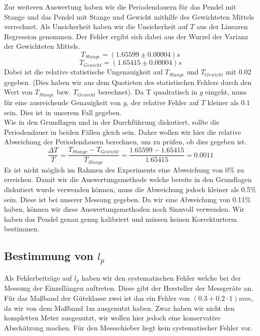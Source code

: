 \documentclass[twoside]{protokoll}
\begin{document}
Zur weiteren Auswertung haben wir die Periodendauern für das Pendel mit Stange und das Pendel mit Stange und Gewicht mithilfe des Gewichteten Mittels verrechnet.
Als Unsicherheit haben wir die Unsicherheit auf $T$ aus der Linearen Regression genommen.
Der Fehler ergibt sich dabei aus der Wurzel der Varianz der Gewichteten Mittels.
\begin{equation}
    T_{Stange} = (1.65599 \pm 0.00004)s
\end{equation}
\begin{equation}
    T_{Gewicht} = (1.65415 \pm 0.00004)s
\end{equation}
Dabei ist die relative statistische Ungenauigkeit auf $T_{Stange}$ und $T_{Gewicht}$ mit $0.02$\textperthousand \quad gegeben. (Dies haben wir aus dem Quotieten des statistischen Fehlers durch den Wert von $T_{Stange}$ bzw. $T_{Gewicht}$ berechnet).
Da T quadratisch in $g$ eingeht, muss für eine ausreichende Genauigkeit von $g$, der relative Fehler auf  $T$ kleiner als $0.1$ \textperthousand sein.
Dies ist in unserem Fall gegeben.\\

Wie in den Grundlagen und in der Durchführung diskutiert, sollte die Periodendauer in beiden Fällen gleich sein.
Daher wollen wir hier die relative Abweichung der Periodendauern berechnen, um zu prüfen, ob dies gegeben ist.
\begin{equation}
    \frac{\Delta T}{T} = \frac{T_{Stange} - T_{Gewicht}}{T_{Stange}} = \frac{1.65599 - 1.65415}{1.65415} = 0.0011
    \label{eq:abweichung_T}
\end{equation}
Es ist nicht möglich im Rahmen des Experiments eine Abweichung von 0\% zu erreichen.
Damit wir die Auswertungsmethode welche bereits in den Grundlagen diskutiert wurde verwenden können, muss die Abweichung jedoch kleiner als 0.5\% sein. 
Diese ist bei unserer Messung gegeben. 
Da wir eine Abweichung von 0.11\% haben, können wir diese Auswertungsmethoden noch Sinnvoll verwenden. 
Wir haben das Pendel genau genug kalibriert und müssen keinen Korrekturterm bestimmen.\\

 
\subsection{Bestimmung von $l_p$}

Als Fehlerbeiträge auf $l_p$ haben wir den systematischen Fehler welche bei der Messung der Einzellängen auftreten.
Diese gibt der Hersteller der Messgeräte an. 
Für das Maßband der Güteklasse zwei ist das ein Fehler von $(0.3 + 0.2\cdot1)mm$, da wir von dem Maßband 1m ausgenutzt haben.
Zwar haben wir nicht den kompletten Meter ausgenutzt, wir wollen hier jedoch eine konservative Abschätzung machen. 
Für den Messschieber liegt kein systematischer Fehler vor.
\end{document}

